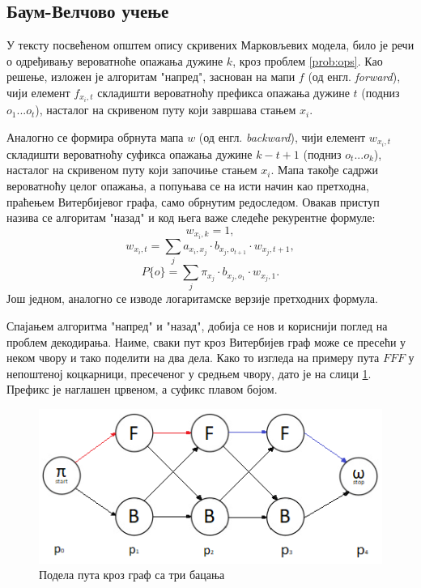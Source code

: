 \documentclass[12pt,oneside]{memoir}
\begin{document}
\begin{CJK}{UTF8}{ipxm}
\section{Баум-Велчово учење}
У тексту посвећеном општем опису скривених Марковљевих модела, било је речи о одређивању вероватноће опажања дужине $k$, кроз проблем \ref{prob:ops}. Као решење, изложен је алгоритам "напред", заснован на мапи $f$ (од енгл. \textit{forward}), чији елемент $f_{x_i, t}$ складишти вероватноћу префикса опажања дужине $t$ (подниз $o_1...o_t$), насталог на скривеном путу који завршава стањем $x_i$.

Аналогно се формира обрнута мапа $w$ (од енгл. \textit{backward}), чији елемент $w_{x_i, t}$ складишти вероватноћу суфикса опажања дужине $k-t+1$ (подниз $o_t...o_k$), насталог на скривеном путу који започиње стањем $x_i$. Мапа такође садржи вероватноћу целог опажања, а попуњава се на исти начин као претходна, праћењем Витербијевог графа, само обрнутим редоследом. Овакав приступ назива се алгоритам "назад" и код њега важе следеће рекурентне формуле: $$w_{x_i, k} = 1,$$ $$w_{x_i, t} = \sum_j  a_{x_i, x_j} \cdot b_{x_j, o_{t+1}} \cdot w_{x_j, t+1},$$ $$P\{o\} = \sum_j \pi_{x_j} \cdot b_{x_j, o_1} \cdot w_{x_j, 1}.$$ Још једном, аналогно се изводе логаритамске верзије претходних формула.

Спајањем алгоритма "напред" и "назад", добија се нов и кориснији поглед на проблем декодирања. Наиме, сваки пут кроз Витербијев граф може се пресећи у неком чвору и тако поделити на два дела. Како то изгледа на примеру пута $FFF$ у непоштеној коцкарници, пресеченог у средњем чвору, дато је на слици \ref{fig:tripod}. Префикс је наглашен црвеном, а суфикс плавом бојом.

\begin{figure}[H]
  \centering
  \includegraphics[width=.9\textwidth]{tri_podela.png}
  \caption{Подела пута кроз граф са три бацања}
  \label{fig:tripod}
\end{figure}


\end{CJK}
\end{document}
